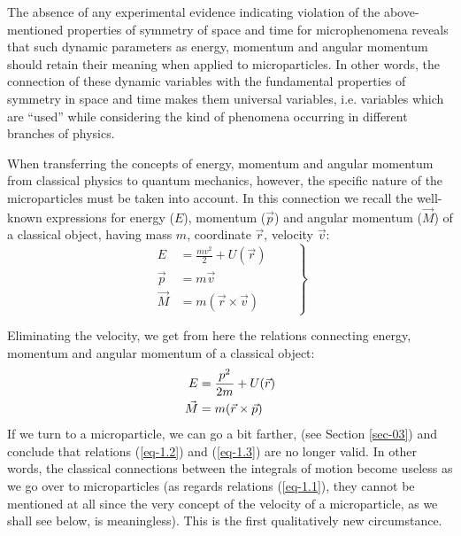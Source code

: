 \documentclass[a4paper,sfsidenotes,colorlinks=true]{tufte-book}
\numberwithin{equation}{section}
\numberwithin{figure}{section}
\begin{document}
The absence of any experimental evidence indicating violation of the
above-mentioned properties of symmetry of space and time for
microphenomena reveals that such dynamic parameters as energy,
momentum and angular momentum should retain their meaning when applied
to microparticles. In other words, the connection of these dynamic
variables with the fundamental properties of symmetry in space and
time makes them universal variables, i.e. variables which are ``used''
while considering the kind of phenomena occurring in different
branches of physics.

When transferring the concepts of energy, momentum and angular
momentum from classical physics to quantum mechanics, however, the
specific nature of the microparticles must be taken into account. In
this connection we recall the well-known expressions for energy ($E$),
momentum ($\vec{p}$) and angular momentum ($\vec{M}$) of a classical
object, having mass $m$, coordinate $\vec{r}$, velocity $\vec{v}$:
\begin{equation}%
\left.
\begin{split}
E & = \frac{mv^{2}}{2} +U(\vec{r}) \\
 \vec{p}& = m\vec{v} \\
\vec{M} & =m(\vec{r} \times \vec{v})
\end{split}
\quad \quad \right\}
\label{eq-1.1}
\end{equation}

Eliminating the velocity, we get from here the relations connecting
energy, momentum and angular momentum of a classical object:
\begin{align}%
E & = \frac{p^{2}}{2m} +U(\vec{r})\label{eq-1.2}\\
\vspace{8pt}
\vec{M} & = m(\vec{r} \times \vec{p}) \label{eq-1.3}
\end{align}
If we turn to a microparticle, we can go a bit farther, (see Section \ref{sec-03})
and conclude that relations (\ref{eq-1.2}) and (\ref{eq-1.3}) are no
longer valid. In other words, the classical connections between the
integrals of motion become useless as we go over to microparticles (as
regards relations (\ref{eq-1.1}), they cannot be mentioned at all
since the very concept of the velocity of a microparticle, as we shall
see below, is meaningless). This is the first qualitatively new
circumstance.  
\end{document}
